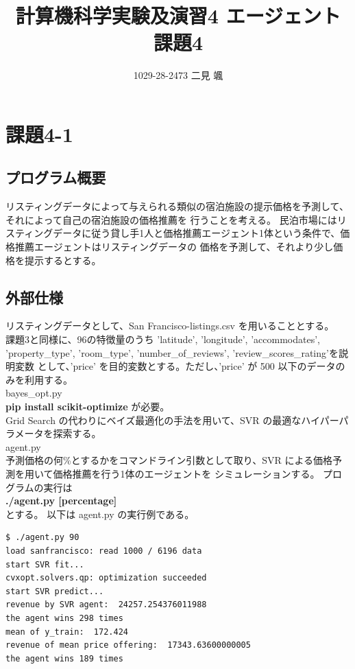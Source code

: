 \documentclass{jsarticle}
\begin{document}
\title{計算機科学実験及演習4 エージェント 課題4}
\author{1029-28-2473 二見 颯}
\maketitle


\section{課題4-1}
\subsection{プログラム概要}
リスティングデータによって与えられる類似の宿泊施設の提示価格を予測して、それによって自己の宿泊施設の価格推薦を
行うことを考える。
民泊市場にはリスティングデータに従う貸し手1人と価格推薦エージェント1体という条件で、価格推薦エージェントはリスティングデータの
価格を予測して、それより少し価格を提示するとする。

\subsection{外部仕様}
リスティングデータとして、San Francisco-listings.csv を用いることとする。 \\
課題3と同様に、96の特徴量のうち
'latitude', 'longitude', 'accommodates', 'property\_type', 'room\_type', 'number\_of\_reviews', 'review\_scores\_rating'を説明変数
として、'price' を目的変数とする。ただし、'price' が 500 以下のデータのみを利用する。 \\
bayes\_opt.py\\
{\bf pip install scikit-optimize} が必要。 \\
Grid Search の代わりにベイズ最適化の手法を用いて、SVR の最適なハイパーパラメータを探索する。\\
agent.py \\
予測価格の何\%とするかをコマンドライン引数として取り、SVR による価格予測を用いて価格推薦を行う1体のエージェントを
シミュレーションする。
プログラムの実行は \\
{\bf ./agent.py [percentage]} \\
とする。
以下は agent.py の実行例である。
\begin{lstlisting}
$ ./agent.py 90
load sanfrancisco: read 1000 / 6196 data
start SVR fit...
cvxopt.solvers.qp: optimization succeeded
start SVR predict...
revenue by SVR agent:  24257.254376011988
the agent wins 298 times
mean of y_train:  172.424
revenue of mean price offering:  17343.63600000005
the agent wins 189 times
\end{lstlisting}
\end{document}

